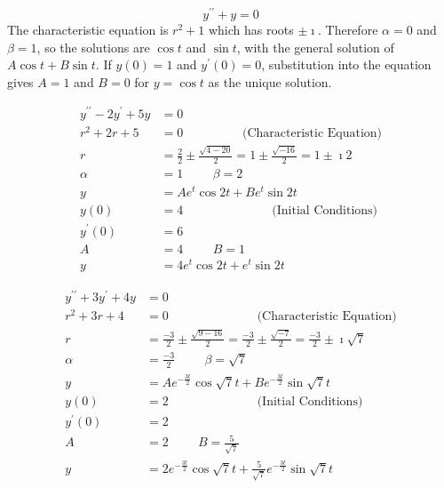 \documentclass[fleqn,letterpaper]{report}
\begin{document}
\begin{example}
\begin{equation*}
y^{\prime \prime} + y = 0
\end{equation*}
 The characteristic equation is $r^2 +1 $ which has roots $\pm
\imath$. Therefore $\alpha = 0$ and $\beta = 1$, so the
solutions are $\cos t$ and $\sin t$, with the general solution
of $A \cos t + B \sin t$. If $y(0) = 1$ and $y^\prime(0) = 0$,
substitution into the equation gives $A=1$ and $B=0$ for $y =
\cos t$ as the unique solution.
\end{example}

\begin{example}
\begin{align*}
y^{\prime \prime} - 2y^\prime + 5y & = 0 \\
r^2 + 2r + 5 & = 0 \hspace{2cm} \text{(Characteristic Equation)} \\
r & = \frac{2}{2} \pm \frac{\sqrt{4-20}}{2} = 1 \pm
\frac{\sqrt{-16}}{2} = 1 \pm \imath 2\\
\alpha & = 1 \hspace{1cm} \beta = 2 \\
y & = A e^t \cos 2t + B e^t \sin 2t \\
y(0) & = 4 \hspace{3cm} \text{(Initial Conditions)}\\
y^\prime(0) & = 6 \\
A & = 4 \hspace{1cm} B = 1 \\
y & = 4e^t \cos 2t + e^t \sin 2t
\end{align*}
\end{example}

\begin{example}
\begin{align*}
y^{\prime \prime} + 3y^\prime + 4y & = 0 \\
r^2 + 3r + 4 & = 0 \hspace{3cm} \text{(Characteristic Equation)} \\
r & = \frac{-3}{2} \pm \frac{\sqrt{9-16}}{2} = \frac{-3}{2} \pm
\frac{\sqrt{-7}}{2} = \frac{-3}{2} \pm \imath \sqrt{7}\\
\alpha & = \frac{-3}{2} \hspace{1cm} \beta = \sqrt{7} \\
y & = A e^{-\frac{3t}{2}} \cos \sqrt{7}t + B e^{-\frac{3t}{2}}
\sin \sqrt{7}t \\
y(0) & = 2 \hspace{3cm} \text{(Initial Conditions)}\\
y^\prime(0) & = 2 \\
A & = 2 \hspace{1cm} B = \frac{5}{\sqrt{7}} \\
y & = 2e^{-\frac{3t}{2}} \cos \sqrt{7} t + \frac{5}{\sqrt{7}}
e^{-\frac{3t}{2}} \sin \sqrt{7} t
\end{align*}
\end{example}
\end{document}
